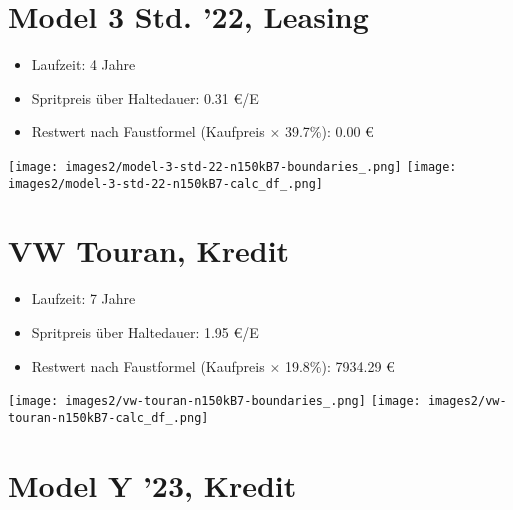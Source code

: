 \documentclass[landscape, DIV=99, 14pt]{scrartcl}
\begin{document}
\twocolumn

\section*{Model 3 Std. '22, Leasing}

\begin{itemize}
    \item Laufzeit: 4 Jahre
    \item Spritpreis \"uber Haltedauer: 0.31 \euro{}/E
    \item Restwert nach Faustformel (Kaufpreis $\times$ 39.7\%): 0.00 \euro{}
\end{itemize}

\pagebreak

\begin{center}
\texttt{[image: images2/model-3-std-22-n150kB7-boundaries\_.png]}
\null
\vspace{0.5cm}
\texttt{[image: images2/model-3-std-22-n150kB7-calc\_df\_.png]}
\end{center}

\pagebreak


\twocolumn

\section*{VW Touran, Kredit}

\begin{itemize}
    \item Laufzeit: 7 Jahre
    \item Spritpreis \"uber Haltedauer: 1.95 \euro{}/E
    \item Restwert nach Faustformel (Kaufpreis $\times$ 19.8\%): 7934.29 \euro{}
\end{itemize}

\pagebreak

\begin{center}
\texttt{[image: images2/vw-touran-n150kB7-boundaries\_.png]}
\null
\vspace{0.5cm}
\texttt{[image: images2/vw-touran-n150kB7-calc\_df\_.png]}
\end{center}

\pagebreak


\twocolumn

\section*{Model Y '23, Kredit}
\end{document}
